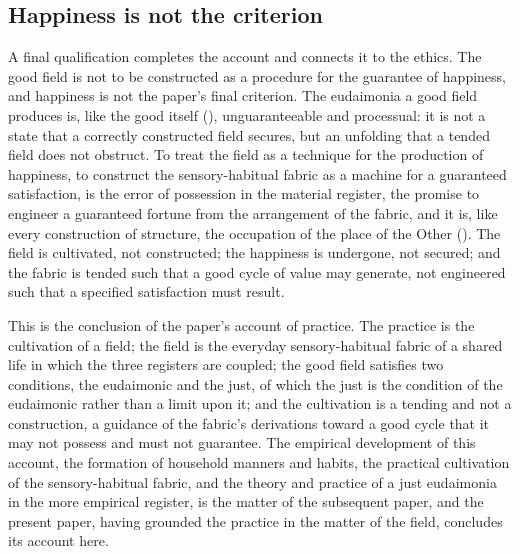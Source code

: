 \subsection{Happiness is not the criterion}
\label{p10:sec:fm-nottruth}

A final qualification completes the account and connects it to the ethics. The good field is not to be constructed as a procedure for the guarantee of happiness, and happiness is not the paper's final criterion. The eudaimonia a good field produces is, like the good itself (), unguaranteeable and processual: it is not a state that a correctly constructed field secures, but an unfolding that a tended field does not obstruct. To treat the field as a technique for the production of happiness, to construct the sensory-habitual fabric as a machine for a guaranteed satisfaction, is the error of possession in the material register, the promise to engineer a guaranteed fortune from the arrangement of the fabric, and it is, like every construction of structure, the occupation of the place of the Other (). The field is cultivated, not constructed; the happiness is undergone, not secured; and the fabric is tended such that a good cycle of value may generate, not engineered such that a specified satisfaction must result.

This is the conclusion of the paper's account of practice. The practice is the cultivation of a field; the field is the everyday sensory-habitual fabric of a shared life in which the three registers are coupled; the good field satisfies two conditions, the eudaimonic and the just, of which the just is the condition of the eudaimonic rather than a limit upon it; and the cultivation is a tending and not a construction, a guidance of the fabric's derivations toward a good cycle that it may not possess and must not guarantee. The empirical development of this account, the formation of household manners and habits, the practical cultivation of the sensory-habitual fabric, and the theory and practice of a just eudaimonia in the more empirical register, is the matter of the subsequent paper, and the present paper, having grounded the practice in the matter of the field, concludes its account here.
